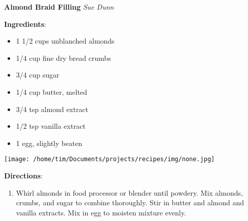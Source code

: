 \documentclass[11pt, twoside, openany]{book}
\begin{document}
\noindent\begin{minipage}[t]{\linewidth}%
{\Large\textbf{Almond Braid Filling}} \label{almond-braid-filling}\hfill\textit{Sue Dunn}\\
\noindent\begin{minipage}[t]{0.78\linewidth}%
\textbf{Ingredients}:\vspace{-3mm}
\begin{multicols}{2}
\begin{itemize}\setlength\itemsep{-1mm}
\item 1 1/2 cups unblanched almonds
\item 1/4 cup fine dry bread crumbs
\item 3/4 cup sugar
\item 1/4 cup butter, melted
\item 3/4 tsp almond extract
\item 1/2 tsp vanilla extract
\item 1 egg, slightly beaten
\end{itemize}
\end{multicols}
\end{minipage}
\noindent\begin{minipage}[t]{0.18\linewidth}
\centering \strut\vspace*{-\baselineskip}\newline
\texttt{[image: /home/tim/Documents/projects/recipes/img/none.jpg]}\\
\end{minipage}\vspace{3mm}
\textbf{Directions}:
\vspace{-3mm}\begin{enumerate}\setlength\itemsep{-1mm}
\item Whirl almonds in food processor or blender until powdery. Mix almonds, crumbs, and sugar to combine thoroughly. Stir in butter and almond and vanilla extracts. Mix in egg to moisten mixture evenly.
\end{enumerate}
\end{minipage}\vspace{8mm}
\end{document}
